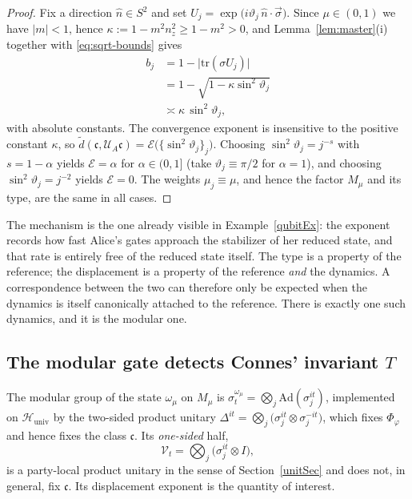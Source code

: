 \documentclass[twoside,11pt,letter]{article}
\def\cH{{\mathcal{H}}}
\def\cU{{\mathcal{U}}}
\def\cV{{\mathcal{V}}}
\def\fc{{\mathfrak{c}}}
\newcommand{\tr}{\mathrm{tr}}
\newcommand{\Ad}{\mathrm{Ad}}
\newcommand{\cexp}{\mathcal{E}}  %
\theoremstyle{definition}
\theoremstyle{definition}
\theoremstyle{plain}
\begin{document}
\begin{proof}
Fix a direction $\hat n \in S^2$ and set $U_j = \exp\bigl( i \vartheta_j\, \hat n \cdot \vec\sigma \bigr)$. Since $\mu \in (0,1)$ we have $|m| < 1$, hence
$\kappa := 1 - m^2 n_z^2 \ge 1 - m^2 > 0$, and Lemma~\ref{lem:master}(i) together with \eqref{eq:sqrt-bounds} gives 
\begin{equation*}
\begin{split}
b_j &= 1 - \bigl| \tr(\sigma U_j) \bigr|\\
&= 1 - \sqrt{ 1 - \kappa \sin^2 \vartheta_j }\\
&\asymp  \kappa \, \sin^2 \vartheta_j ,
\end{split}
\end{equation*}
with absolute constants. The convergence exponent is insensitive to the positive constant $\kappa$, so $\tilde d(\fc, \cU_A\fc) = \cexp\bigl( \{ \sin^2 \vartheta_j \}_j \bigr)$. Choosing $\sin^2 \vartheta_j = j^{-s}$ with $s = 1 - \alpha$ yields $\cexp = \alpha$ for $\alpha \in (0,1]$ (take $\vartheta_j \equiv \pi/2$ for $\alpha = 1$), and choosing $\sin^2 \vartheta_j = j^{-2}$ yields $\cexp = 0$. The weights $\mu_j \equiv \mu$, and hence the factor $M_\mu$ and its type, are the same in all cases.
\end{proof}

The mechanism is the one already visible in Example~\ref{qubitEx}: the exponent records how fast Alice's gates approach the stabilizer of her reduced state, and that rate is entirely free of the reduced state itself. The type is a property of the reference; the displacement is a property of the reference \emph{and} the dynamics. A correspondence between the two can therefore only be expected when the dynamics is itself canonically attached to the reference. There is exactly one such dynamics, and it is the modular one.

\subsection{The modular gate detects Connes' invariant \texorpdfstring{$T$}{T}}
\label{sec:AW-connes}

The modular group of the state $\omega_\mu$ on $M_\mu$ is $\sigma^{\omega_\mu}_t = \bigotimes_j \Ad(\sigma_j^{it})$, implemented on $\cH_{\mathrm{univ}}$ by the two-sided product unitary $\Delta^{it} = \bigotimes_j \bigl( \sigma_j^{it} \otimes \sigma_j^{-it} \bigr)$, which fixes $\Phi_\varphi$ and hence fixes the class $\fc$. Its \emph{one-sided} half,
\begin{equation}
\label{eq:modular-gate}
\cV_t = \bigotimes_j \bigl( \sigma_j^{it} \otimes I \bigr),
\end{equation}
is a party-local product unitary in the sense of Section~\ref{unitSec} and does not, in
general, fix $\fc$. Its displacement exponent is the quantity of interest.
\end{document}
